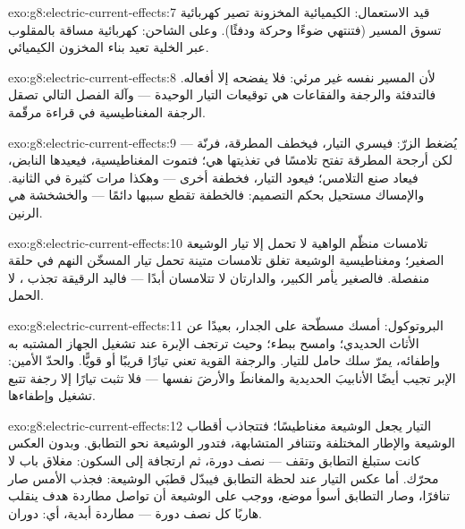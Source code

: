 \begin{solution}{exo:g8:electric-current-effects:7}
قيد الاستعمال:  الكيميائية المخزونة تصير  كهربائية
تسوق المسير (فتنتهي ضوءًا وحركة ودفئًا). وعلى الشاحن: 
كهربائية مساقة بالمقلوب عبر الخلية تعيد بناء المخزون
الكيميائي.
\end{solution}

\begin{solution}{exo:g8:electric-current-effects:8}
لأن المسير نفسه غير مرئي: فلا يفضحه إلا أفعاله. فالتدفئة
والرجفة والفقاعات هي توقيعات التيار الوحيدة --- وآلة الفصل
التالي تصقل الرجفة المغناطيسية في قراءة مرقّمة.
\end{solution}

\begin{solution}{exo:g8:electric-current-effects:9}
يُضغط الزرّ: فيسري التيار، فيخطف  المطرقة،
فرنّة --- لكن أرجحة المطرقة تفتح تلامسًا في تغذيتها هي؛
فتموت المغناطيسية، فيعيدها النابض، فيعاد صنع التلامس؛ فيعود
التيار، فخطفة أخرى --- وهكذا مرات كثيرة في الثانية. والإمساك
مستحيل بحكم التصميم: فالخطفة تقطع سببها دائمًا --- والخشخشة
\emph{هي} الرنين.
\end{solution}

\begin{solution}{exo:g8:electric-current-effects:10}
تلامسات منظّم  الواهية لا تحمل إلا تيار الوشيعة الصغير؛
ومغناطيسية الوشيعة تغلق تلامسات متينة تحمل تيار المسخّن النهم
في حلقة منفصلة. فالصغير يأمر الكبير، والدارتان لا تتلامسان
أبدًا --- فاليد الرقيقة تجذب ، لا الحمل.
\end{solution}

\begin{solution}{exo:g8:electric-current-effects:11}
البروتوكول: أمسك  مسطّحة على الجدار، بعيدًا عن الأثاث
الحديدي؛ وامسح ببطء؛ وحيث ترتجف الإبرة عند تشغيل الجهاز
المشتبه به وإطفائه، يمرّ سلك حامل للتيار. والرجفة القوية تعني
تيارًا قريبًا أو قويًّا. والحدّ الأمين: الإبر تجيب أيضًا
الأنابيبَ الحديدية والمغانطَ والأرضَ نفسها --- فلا تثبت تيارًا
إلا رجفة تتبع تشغيل  وإطفاءها.
\end{solution}

\begin{solution}{exo:g8:electric-current-effects:12}
التيار يجعل الوشيعة مغناطيسًا؛ فتتجاذب أقطاب الوشيعة والإطار
المختلفة وتتنافر المتشابهة، فتدور الوشيعة نحو التطابق. وبدون
العكس كانت ستبلغ التطابق وتقف --- نصف دورة، ثم ارتجافة إلى
السكون: مغلاق باب لا محرّك. أما عكس التيار عند لحظة التطابق
فيبدّل قطبَي الوشيعة: فجذب الأمس صار تنافرًا، وصار التطابق أسوأ
موضع، ووجب على الوشيعة أن تواصل مطاردة هدف ينقلب هاربًا كل نصف
دورة --- مطاردة أبدية، أي: دوران.
\end{solution}

